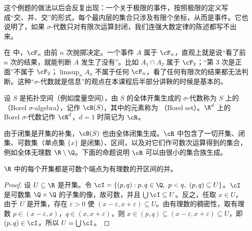 这个例题的做法以后会反复出现：一个关于极限的事件，按照极限的定义写成“交、并、交”的形式，每个最内层的集合只涉及有限个坐标，从而是事件。它也说明了，如果 $\sigma$-代数只对有限次运算封闭，我们连强大数定律的陈述都写不出来。

\begin{remark}
在 中，$\cF_n$ 由前 $n$ 次抛掷决定。一个事件 $A$ 属于 $\cF_n$，直观上就是说“看了前 $n$ 次的结果，就能判断 $A$ 发生了没有”。比如 $A_1\cap A_2$ 属于 $\cF_2$；“第 $3$ 次是正面”不属于 $\cF_2$；$\limsup_nA_n$ 不属于任何 $\cF_n$，看了任何有限次的结果都无法判断。这种“$\sigma$-代数就是信息”的观点在本课程后半部分讲鞅的时候是基本的。
\end{remark}


\begin{definition}\label{def:set-systems:borel}
设 $S$ 是拓扑空间（例如度量空间），由 $S$ 的全体开集生成的 $\sigma$-代数称为 $S$ 上的 （Borel $\sigma$-algebra），记作 $\cB(S)$，其中的元素称为 （Borel set）。$\R^d$ 上的 Borel $\sigma$-代数记作 $\cR^d$，$d=1$ 时简记为 $\cR$。
\end{definition}

由于闭集是开集的补集，$\cB(S)$ 也由全体闭集生成。$\cR$ 中包含了一切开集、闭集、可数集（单点集 $\{x\}$ 是闭集）、区间，以及对它们作可数次运算得到的集合，例如全体无理数 $\R\setminus\Q$。下面的命题说明 $\cR$ 可以由很小的集合族生成。

\begin{lemma}\label{lem:set-systems:open-sets-R}
$\R$ 中的每个开集都是可数个端点为有理数的开区间的并。
\end{lemma}
\begin{proof}
设 $U\subseteq\R$ 是开集。令 $\cI=\{(p,q): p,q\in\Q,\ p<q,\ (p,q)\subseteq U\}$。$\cI$ 是可数集 $\Q\times\Q$ 的子集的像，故可数，并且 $\bigcup\cI\subseteq U$。反之，任取 $x\in U$，由于 $U$ 是开集，存在 $\varepsilon>0$ 使 $(x-\varepsilon,x+\varepsilon)\subseteq U$。由有理数的稠密性，取有理数 $p\in(x-\varepsilon,x)$，$q\in(x,x+\varepsilon)$，则 $x\in(p,q)\subseteq(x-\varepsilon,x+\varepsilon)\subseteq U$，即 $(p,q)\in\cI$。所以 $U=\bigcup\cI$。
\end{proof}

